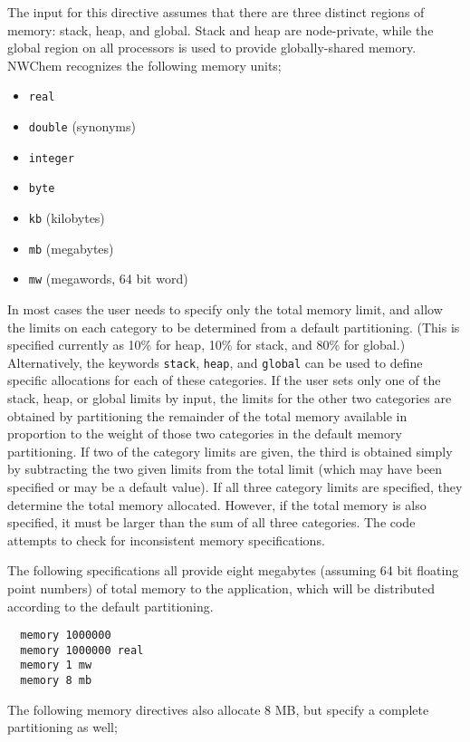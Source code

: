 The input for
this directive assumes that there are three distinct regions of
memory: stack, heap, and global.  Stack and heap are node-private,
while the global region on all processors is used to provide
globally-shared memory.  NWChem
recognizes the following memory units;

\begin{itemize}
\item \verb+real+
\item \verb+double+ (synonyms)
\item \verb+integer+
\item \verb+byte+
\item \verb+kb+ (kilobytes)
\item \verb+mb+ (megabytes)
\item \verb+mw+ (megawords, 64 bit word)
\end{itemize}

In most cases the user needs to specify only the total memory limit, and
allow the limits on each category to be determined from a default
partitioning.  (This is specified currently as 10\% for heap, 10\% for stack, 
and 80\% for
global.)  Alternatively, the keywords \verb+stack+, \verb+heap+, and
\verb+global+ can be used to define specific allocations for each of
these categories.  If the user sets only one of the stack, heap, or global
limits by input, the limits for the other two categories are obtained
by partitioning the remainder of the total memory available in proportion 
to the weight of those two categories in the default memory
partitioning.  If two of the category limits are given, the third is
obtained simply by subtracting the two given limits from the total limit
(which may have been specified or may be a default value).  If all three
category limits are specified, they determine the total memory allocated.
However,  if the
total memory is also specified, it must be larger than the sum of all
three categories.  The code
attempts to check for inconsistent memory specifications.

The following specifications all provide eight megabytes (assuming 64
bit floating point numbers) of total memory to the application, which
will be distributed according to the default partitioning.
\begin{verbatim}
  memory 1000000
  memory 1000000 real
  memory 1 mw
  memory 8 mb
\end{verbatim}

The following memory directives also allocate 8 MB, but specify a complete
partitioning as well;

